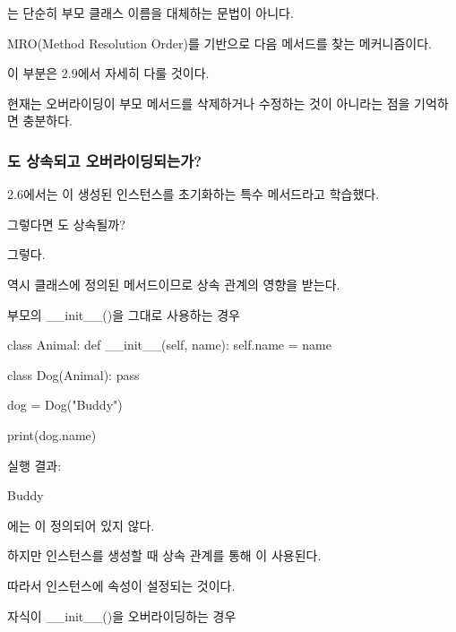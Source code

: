 는 단순히 부모 클래스 이름을 대체하는 문법이 아니다.

MRO(Method Resolution Order)를 기반으로 다음 메서드를 찾는 메커니즘이다.

이 부분은 2.9에서 자세히 다룰 것이다.

현재는 오버라이딩이 부모 메서드를 삭제하거나 수정하는 것이 아니라는 점을 기억하면 충분하다.

\subsubsection{도 상속되고 오버라이딩되는가?}

2.6에서는 이 생성된 인스턴스를 초기화하는 특수 메서드라고 학습했다.

그렇다면 도 상속될까?

그렇다.

 역시 클래스에 정의된 메서드이므로 상속 관계의 영향을 받는다.

\begin{dhknote}
\begin{dhksmry}[centered]
부모의 __init__()을 그대로 사용하는 경우
\end{dhksmry}
\end{dhknote}

\begin{dhkcode}
class Animal:
    def __init__(self, name):
        self.name = name


class Dog(Animal):
    pass


dog = Dog("Buddy")

print(dog.name)
\end{dhkcode}

실행 결과:

\begin{dhkzsh}
Buddy
\end{dhkzsh}

에는 이 정의되어 있지 않다.

하지만 인스턴스를 생성할 때 상속 관계를 통해 이 사용된다.

따라서  인스턴스에  속성이 설정되는 것이다.

\begin{dhknote}
\begin{dhksmry}[centered]
자식이 __init__()을 오버라이딩하는 경우
\end{dhksmry}
\end{dhknote}


